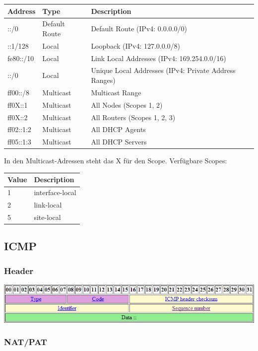 \begin{tabular}[h]{|l|l|l|}
	\hline
	\textbf{Address} & \textbf{Type} & \textbf{Description} \\
	\hline
	::/0 & Default Route & Default Route (IPv4: 0.0.0.0/0) \\
	::1/128 & Local & Loopback (IPv4: 127.0.0.0/8) \\
	fe80::/10 & Local & Link Local Addresses (IPv4: 169.254.0.0/16) \\
	::/0 & Local & Unique Local Addresses (IPv4: Private Address Ranges) \\
	ff00::/8 & Multicast & Multicast Range \\
	ff0X::1 & Multicast & All Nodes (Scopes 1, 2) \\
	ff0X::2 & Multicast & All Routers (Scopes 1, 2, 3) \\
	ff02::1:2 & Multicast & All DHCP Agents \\
	ff05::1:3 & Multicast & All DHCP Servers \\
	\hline
\end{tabular}

In den Multicast-Adressen steht das X für den Scope. Verfügbare Scopes:

\begin{tabular}[h]{|l|l|}
	\hline
	\textbf{Value} & \textbf{Description} \\
	\hline
	1 & interface-local \\
	2 & link-local \\
	5 & site-local \\
	\hline
\end{tabular}


\subsection{ICMP}

\subsubsection{Header}

\includegraphics[width=\textwidth]{media/ICMPRequest.png}

\subsubsection{NAT/PAT}

